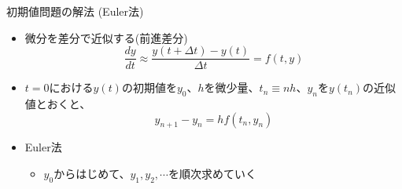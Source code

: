 \begin{frame}[t,fragile]{初期値問題の解法 (Euler法)}
  \begin{itemize}
    \setlength{\itemsep}{1em}
  \item 微分を差分で近似する(前進差分)
    \[
    \frac{dy}{dt} \approx \frac{y(t+\Delta t) - y(t)}{\Delta t} = f(t, y)
    \]
  \item $t=0$における$y(t)$の初期値を$y_0$、$h$を微少量、$t_n \equiv nh$、$y_n$を$y(t_n)$の近似値とおくと、
    \[
    y_{n+1}-y_n = h f( t_n, y_n)
    \]
  \item Euler法
    \begin{itemize}
    \item $y_0$からはじめて、$y_1,y_2,\cdots$を順次求めていく
    \end{itemize}
  \end{itemize}
\end{frame}
